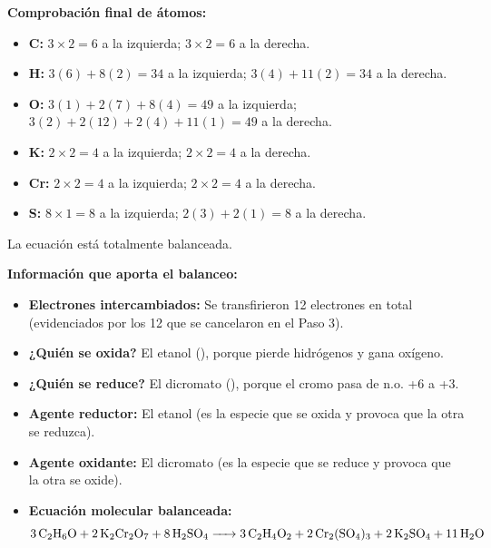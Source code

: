 \textbf{Comprobación final de átomos:}
\begin{itemize}
    \item \textbf{C:} $3 \times 2 = 6$ a la izquierda; $3 \times 2 = 6$ a la derecha.
    \item \textbf{H:} $3(6) + 8(2) = 34$ a la izquierda; $3(4) + 11(2) = 34$ a la derecha.
    \item \textbf{O:} $3(1) + 2(7) + 8(4) = 49$ a la izquierda; $3(2) + 2(12) + 2(4) + 11(1) = 49$ a la derecha.
    \item \textbf{K:} $2 \times 2 = 4$ a la izquierda; $2 \times 2 = 4$ a la derecha.
    \item \textbf{Cr:} $2 \times 2 = 4$ a la izquierda; $2 \times 2 = 4$ a la derecha.
    \item \textbf{S:} $8 \times 1 = 8$ a la izquierda; $2(3) + 2(1) = 8$ a la derecha.
\end{itemize}
La ecuación está totalmente balanceada.

\vspace{0.5cm}

\textbf{Información que aporta el balanceo:}
\begin{itemize}
    \item \textbf{Electrones intercambiados:} Se transfirieron 12 electrones en total (evidenciados por los 12 \ce{[H]} que se cancelaron en el Paso 3).
    \item \textbf{¿Quién se oxida?} El etanol (), porque pierde hidrógenos y gana oxígeno.
    \item \textbf{¿Quién se reduce?} El dicromato (), porque el cromo pasa de n.o. +6 a +3.
    \item \textbf{Agente reductor:} El etanol (es la especie que se oxida y provoca que la otra se reduzca).
    \item \textbf{Agente oxidante:} El dicromato (es la especie que se reduce y provoca que la otra se oxide).
    \item \textbf{Ecuación molecular balanceada:} 
    \[
    \ce{3C2H6O + 2K2Cr2O7 + 8H2SO4 -> 3C2H4O2 + 2Cr2(SO4)3 + 2K2SO4 + 11H2O}
    \]
\end{itemize}